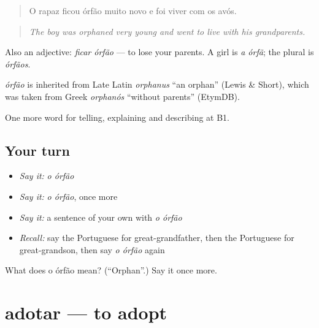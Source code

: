\begin{quote}
O rapaz ficou órfão muito novo e foi viver com os avós.
\end{quote}

\begin{quote}
\emph{The boy was orphaned very young and went to live with his grandparents.}
\end{quote}

Also an adjective: \emph{ficar órfão} — to lose your parents. A girl is \emph{a órfã}; the plural is \emph{órfãos}.

\begin{cousinweb}
\emph{órfão} is inherited from Late Latin \emph{orphanus} \textquotedblleft{}an orphan\textquotedblright{} (Lewis \& Short), which was taken from Greek \emph{orphanós} \textquotedblleft{}without parents\textquotedblright{} (EtymDB).
\end{cousinweb}

\begin{grammarlens}[title={What you've built}]
One more word for telling, explaining and describing at B1.
\end{grammarlens}

\subsection*{Your turn}
\begin{itemize}
\raggedright
  \item \emph{Say it:} \emph{o órfão}
  \item \emph{Say it:} \emph{o órfão}, once more
  \item \emph{Say it:} a sentence of your own with \emph{o órfão}
  \item \emph{Recall:} say the Portuguese for great-grandfather, then the Portuguese for great-grandson, then say \emph{o órfão} again
\end{itemize}

\begin{tcolorbox}[breakable,colback=teal!4,colframe=teal!35!black,title={Before you move on}]
What does o órfão mean? (\textquotedblleft{}Orphan\textquotedblright{}.) Say it once more.
\end{tcolorbox}
\section[adotar]{adotar — to adopt}

\label{lesson:PT-C493-adotar}



